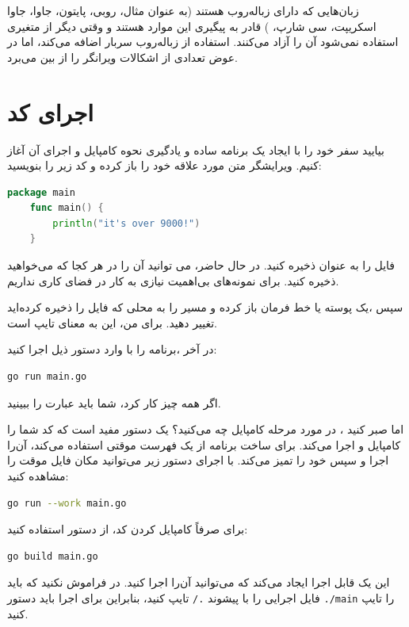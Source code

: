 \documentclass{book}
\begin{document}
زبان‌هایی که دارای زباله‌روب هستند (به عنوان مثال، روبی، پایتون، جاوا، جاوا اسکریپت، سی شارپ، ) قادر به پیگیری این موارد هستند
و وقتی دیگر از متغیری استفاده نمی‌شود آن را آزاد می‌کنند. استفاده از زباله‌روب سربار اضافه می‌کند، اما در عوض تعدادی از اشکالات ویرانگر را از بین می‌برد.
\newpage
\section{اجرای کد }
بیایید سفر خود را با ایجاد یک برنامه ساده و یادگیری نحوه کامپایل و اجرای آن آغاز کنیم. ویرایشگر متن مورد علاقه خود را باز کرده و کد زیر را بنویسید:
\begin{latin}
	\begin{lstlisting}[language=Go]
	package main
	func main() {
		println("it's over 9000!")
	}
	\end{lstlisting}
\end{latin}

فایل را به عنوان  ذخیره کنید. در حال حاضر، می توانید آن را در هر کجا که می‌خواهید ذخیره کنید. برای نمونه‌های بی‌اهمیت نیازی به کار در فضای کاری  نداریم.

سپس ،یک پوسته یا خط فرمان باز کرده و مسیر را به محلی که فایل را ذخیره کرده‌اید تغییر دهید. برای من، این به معنای تایپ  
است.


در آخر ،برنامه را با وارد دستور ذیل اجرا کنید:
\begin{latin}
	\begin{lstlisting}[language=bash]
		go run main.go
	\end{lstlisting}
\end{latin}

اگر همه چیز کار کرد، شما باید عبارت   را ببینید.

اما صبر کنید ، در مورد مرحله کامپایل چه می‌کنید؟  یک دستور مفید است که کد شما را کامپایل و اجرا می‌کند. برای ساخت برنامه از یک فهرست موقتی استفاده می‌کند، آن‌را اجرا و سپس خود را تمیز می‌کند. با اجرای دستور زیر می‌توانید مکان فایل موقت را مشاهده کنید:
\begin{latin}
	\begin{lstlisting}[language=bash]
		go run --work main.go
	\end{lstlisting}
\end{latin}

برای صرفاً کامپایل کردن کد، از دستور   استفاده کنید:
\begin{latin}
	\begin{lstlisting}[language=bash]
		go build main.go
	\end{lstlisting}
\end{latin}
این یک  قابل اجرا ایجاد می‌کند که می‌توانید آن‌را اجرا کنید. در  فراموش نکنید که باید فایل اجرایی را با پیشوند \verb*|./| تایپ کنید، بنابراین برای اجرا باید دستور \verb*|./main|  را تایپ کنید.
\end{document}
